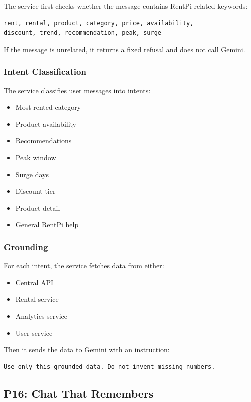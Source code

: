 \documentclass[11pt,a4paper]{article}
\begin{document}
The service first checks whether the message contains RentPi-related keywords:

\begin{lstlisting}
rent, rental, product, category, price, availability,
discount, trend, recommendation, peak, surge
\end{lstlisting}

If the message is unrelated, it returns a fixed refusal and does not call Gemini.

\subsubsection*{Intent Classification}

The service classifies user messages into intents:

\begin{itemize}
  \item Most rented category
  \item Product availability
  \item Recommendations
  \item Peak window
  \item Surge days
  \item Discount tier
  \item Product detail
  \item General RentPi help
\end{itemize}

\subsubsection*{Grounding}

For each intent, the service fetches data from either:

\begin{itemize}
  \item Central API
  \item Rental service
  \item Analytics service
  \item User service
\end{itemize}

Then it sends the data to Gemini with an instruction:

\begin{lstlisting}
Use only this grounded data. Do not invent missing numbers.
\end{lstlisting}

\subsection{P16: Chat That Remembers}
\end{document}
